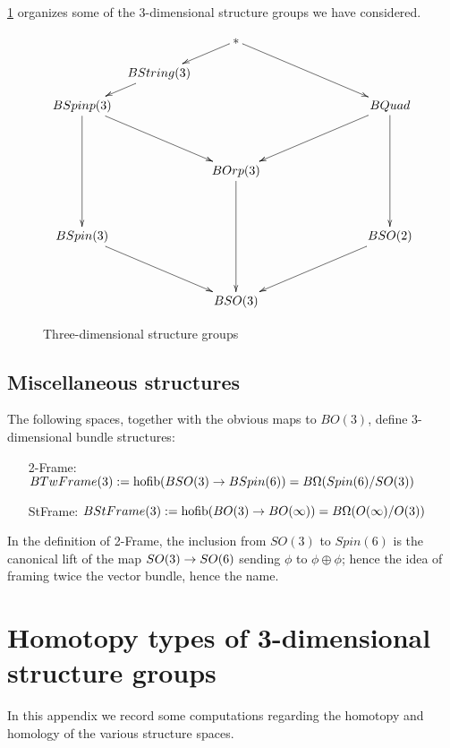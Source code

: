 \documentclass{amsart}
\begin{document}
\cref{fig-structuregroups} organizes some of the 3-dimensional structure groups we have considered.
\begin{figure}[!ht]
\[
\xymatrix@!R@!C@R=10pt@C=5pt{
&& \ast \ar[dl] \ar[ddrr] && \\
& BString(3) \ar[dl] &&& \\
BSpinp(3) \ar[ddrr] \ar[dddd] &&&& BQuad \ar[ddll] \ar[dddd] \\
&&&& \\
&& BOrp(3) \ar[dddd] && \\
&&&& \\
BSpin(3) \ar[ddrr] &&&& BSO(2) \ar[ddll] \\
&&&& \\
&& BSO(3) &&
}
\]
\caption{Three-dimensional structure groups} \label{fig-structuregroups}
\end{figure}

\subsection{Miscellaneous structures}

\begin{definition}
The following spaces, together with the obvious maps to $BO(3)$, define 3-dimensional bundle structures:
\begin{itemize}
\item[2-Frame:] $BTwFrame(3) := \operatorname{hofib}(BSO(3) \rightarrow BSpin(6)) = B\Omega(Spin(6)/SO(3))$
\item[StFrame:] $BStFrame(3) := \operatorname{hofib}(BO(3) \rightarrow BO(\infty)) = B\Omega(O(\infty)/O(3))$
\end{itemize}
\end{definition}

\nid In the definition of 2-Frame, the inclusion from $SO(3)$ to $Spin(6)$ is the canonical lift of the map $SO(3) \rightarrow SO(6)$ sending $\phi$ to $\phi \oplus \phi$; hence the idea of framing twice the vector bundle, hence the name.  


\section{Homotopy types of 3-dimensional structure groups}


In this appendix we record some computations regarding the homotopy and homology of the various structure spaces.
\end{document}
